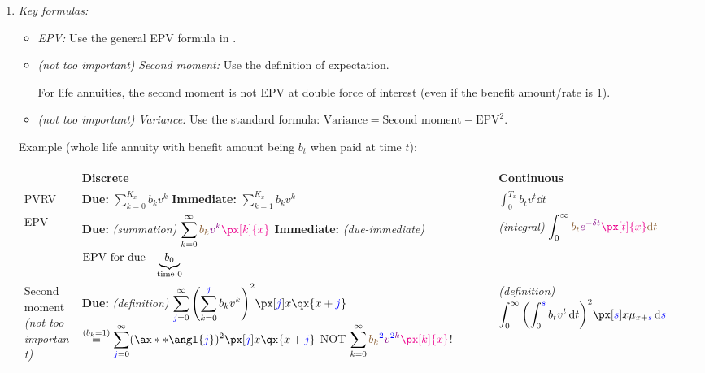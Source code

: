 \begin{enumerate}
\begin{enumerate}[label={(\arabic*)}]
\item \emph{Key formulas:}
\begin{itemize}
\item \emph{EPV:} Use the general EPV formula in .
\item \emph{(not too important)} \emph{Second moment:} Use the definition of
expectation. \begin{warning} For life annuities, the second moment is
\underline{not} EPV at double force of interest (even if the benefit
amount/rate is \(1\)).
\end{warning}
\item \emph{(not too important)} \emph{Variance:} Use the standard formula:
\(\text{Variance}=\text{Second moment}-\text{EPV}^{2}\).
\end{itemize}
Example (whole life annuity with benefit amount being \(b_t\) when paid at time \(t\)):
\begin{center}
\begin{tabular}{lll}
\toprule
&Discrete&Continuous \\
\midrule
PVRV&\makecell[l]{\textbf{Due:} \(\displaystyle \sum_{k=0}^{K_x}b_kv^k\) \\
\textbf{Immediate:} \(\displaystyle \sum_{k=1}^{K_x}b_kv^k\)
}&\(\displaystyle \int_{0}^{T_x}b_tv^t\dd{t}\) \\
\midrule
EPV&
\makecell[l]{\textbf{Due:} \emph{(summation)} \(\displaystyle \sum_{k=0}^{\infty}\brc{b_k}\vc{v^k}\mgc{\px[k]{x}}\)\\
\textbf{Immediate:} \emph{(due-immediate)}\\  \(\text{EPV for due}-\underbrace{b_0}_{\mathclap{\text{time 0}}}\)
}
&\emph{(integral)} \(\displaystyle \int_{0}^{\infty}\brc{b_t}\vc{e^{-\delta t}}\mgc{\px[t]{x}}\brc{\dd{t}}\)
 \\
\midrule
\makecell[l]{Second moment\\
\emph{(not too important)}}&
\makecell[l]{
\textbf{Due:} \emph{(definition)} \\
\(\displaystyle \sum_{\blc{j}=0}^{\infty}\qty(\sum_{k=0}^{\blc{j}}b_kv^k)^{2}\px[\blc{j}]{x}\qx{x+\blc{j}}
\) \\
\(\displaystyle \overset{(b_k=1)}{=}\sum_{\blc{j}=0}^{\infty}(\ax**{\angl{\blc{j}}})^{2}\px[\blc{j}]{x}\qx{x+\blc{j}}\) \\
\warn{} NOT \(\displaystyle
\sum_{k=0}^{\infty}\brc{b_k}^{\blc{2}}\vc{v^{\blc{2}k}}\mgc{\px[k]{x}}\)!
}
& \makecell[l]{\emph{(definition)} \\
\(\displaystyle \int_{0}^{\infty}\qty(\int_{0}^{\blc{s}}b_tv^t\dd{t})^{2}\px[\blc{s}]{x}\mu_{x+\blc{s}}\dd{\blc{s}}\) \\
}
\end{tabular}
\end{center}
\end{enumerate}
\end{enumerate}
